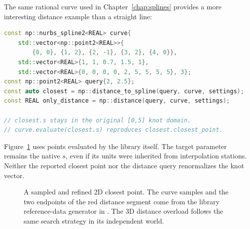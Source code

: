 The same rational curve used in Chapter~\ref{chap:splines} provides a more
interesting distance example than a straight line:
\par\noindent\begin{minipage}{\linewidth}
\begin{lstlisting}[language=C++]
const np::nurbs_spline2<REAL> curve{
    std::vector<np::point2<REAL>>{
        {0, 0}, {1, 2}, {2, -1}, {3, 2}, {4, 0}},
    std::vector<REAL>{1, 1, 0.7, 1.5, 1},
    std::vector<REAL>{0, 0, 0, 0, 2, 5, 5, 5, 5}, 3};
const np::point2<REAL> query{2, 2.5};
const auto closest = np::distance_to_spline(query, curve, settings);
const REAL only_distance = np::distance(query, curve, settings);

// closest.s stays in the original [0,5] knot domain.
// curve.evaluate(closest.s) reproduces closest.closest_point.
\end{lstlisting}
\end{minipage}\par
Figure~\ref{fig:spline-closest} uses points evaluated by the library itself.
The target parameter remains the native $s$, even if its units were inherited
from interpolation stations. Neither the reported closest point nor the
distance query renormalizes the knot vector.

\begin{figure}[htbp]
\centering
{}
\caption{A sampled and refined 2D closest point. The curve samples and the two
endpoints of the red distance segment come from the library reference-data
generator in . The 3D distance overload follows the same
search strategy in its independent world.}
\label{fig:spline-closest}
\end{figure}

